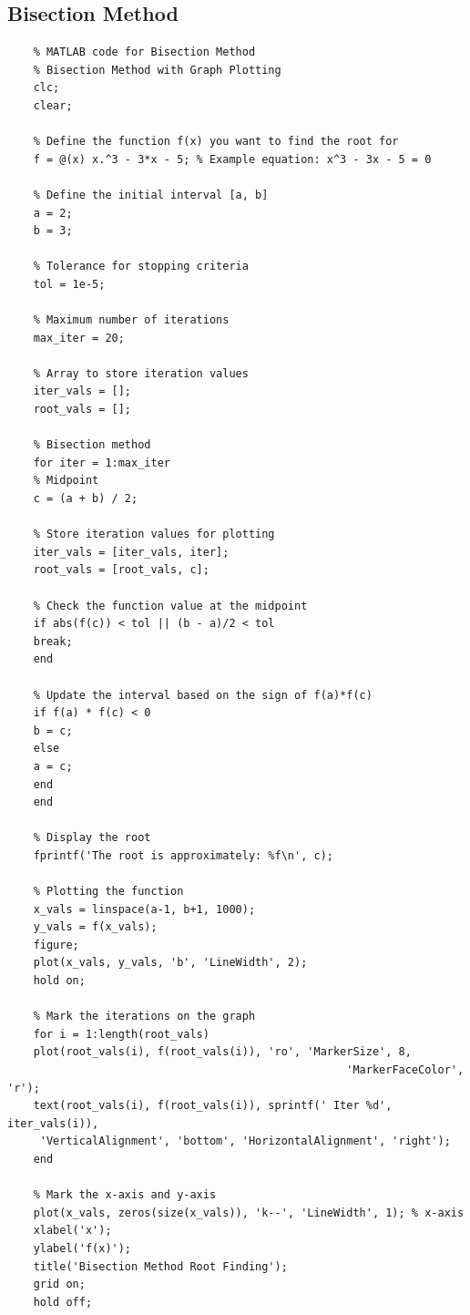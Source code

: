 \documentclass[12pt,a4paper]{article}
\begin{document}
\subsection{ Bisection Method}
\begin{verbatim}
	% MATLAB code for Bisection Method
	% Bisection Method with Graph Plotting
	clc;
	clear;
	
	% Define the function f(x) you want to find the root for
	f = @(x) x.^3 - 3*x - 5; % Example equation: x^3 - 3x - 5 = 0
	
	% Define the initial interval [a, b]
	a = 2;
	b = 3;
	
	% Tolerance for stopping criteria
	tol = 1e-5;
	
	% Maximum number of iterations
	max_iter = 20;
	
	% Array to store iteration values
	iter_vals = [];
	root_vals = [];
	
	% Bisection method
	for iter = 1:max_iter
	% Midpoint
	c = (a + b) / 2;
	
	% Store iteration values for plotting
	iter_vals = [iter_vals, iter];
	root_vals = [root_vals, c];
	
	% Check the function value at the midpoint
	if abs(f(c)) < tol || (b - a)/2 < tol
	break;
	end
	
	% Update the interval based on the sign of f(a)*f(c)
	if f(a) * f(c) < 0
	b = c;
	else
	a = c;
	end
	end
	
	% Display the root
	fprintf('The root is approximately: %f\n', c);
	
	% Plotting the function
	x_vals = linspace(a-1, b+1, 1000);
	y_vals = f(x_vals);
	figure;
	plot(x_vals, y_vals, 'b', 'LineWidth', 2);
	hold on;
	
	% Mark the iterations on the graph
	for i = 1:length(root_vals)
	plot(root_vals(i), f(root_vals(i)), 'ro', 'MarkerSize', 8, 
													'MarkerFaceColor', 'r');
	text(root_vals(i), f(root_vals(i)), sprintf(' Iter %d', iter_vals(i)),
	 'VerticalAlignment', 'bottom', 'HorizontalAlignment', 'right');
	end
	
	% Mark the x-axis and y-axis
	plot(x_vals, zeros(size(x_vals)), 'k--', 'LineWidth', 1); % x-axis
	xlabel('x');
	ylabel('f(x)');
	title('Bisection Method Root Finding');
	grid on;
	hold off;
	
\end{verbatim}
\end{document}

